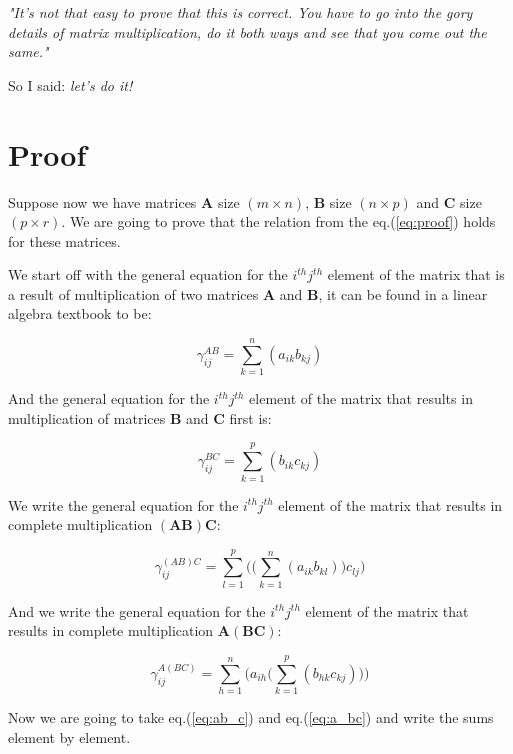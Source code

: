 \documentclass[10pt,twocolumn]{article}
\begin{document}
\textit{"It's not that easy to prove that this is correct. You have to go into the gory details of matrix multiplication, do it both ways and see that you come out the same."}

So I said: \textit{let's do it!}

\section*{Proof}

Suppose now we have matrices $\bm{A}$ size $(m \times n)$, $\bm{B}$ size $(n \times p)$ and $\bm{C}$ size $(p \times r)$. We are going to prove that the relation from the eq.(\ref{eq:proof}) holds for these matrices.

We start off with the general equation for the $i^{th} j^{th}$ element of the matrix that is a result of multiplication of two matrices $\bm{A}$ and $\bm{B}$, it can be found in a linear algebra textbook to be:

\begin{equation}
\gamma_{ij}^{AB} = \sum_{k=1}^{n} (a_{ik} b_{kj})
\end{equation}

And the general equation for the $i^{th} j^{th}$ element of the matrix that results in multiplication of matrices $\bm{B}$ and $\bm{C}$ first is:

\begin{equation}
\gamma_{ij}^{BC} = \sum_{k=1}^{p} (b_{ik} c_{kj})
\end{equation}

We write the general equation for the $i^{th} j^{th}$ element of the matrix that results in complete multiplication $(\bm{A} \bm{B}) \bm{C}$:

\begin{equation} \label{eq:ab_c}
\gamma_{ij}^{(AB)C} = \sum_{l=1}^{p} \Big( \big( \sum_{k=1}^{n} (a_{ik} b_{kl}) \big) c_{lj} \Big)
\end{equation}

And we write the general equation for the $i^{th} j^{th}$ element of the matrix that results in complete multiplication $\bm{A} (\bm{B} \bm{C})$:

\begin{equation} \label{eq:a_bc}
\gamma_{ij}^{A(BC)} = \sum_{h=1}^{n} \Big(  a_{ih} \big( \sum_{k=1}^{p} (b_{hk} c_{kj}) \big) \Big)
\end{equation}

Now we are going to take eq.(\ref{eq:ab_c}) and eq.(\ref{eq:a_bc}) and write the sums element by element.
\end{document}
